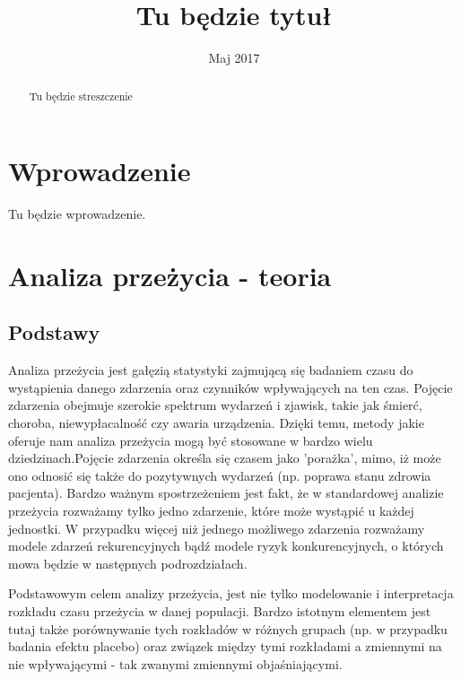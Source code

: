 \documentclass[]{pracamgr}
\title{Tu będzie tytuł}
\date{Maj 2017}
\begin{document}
\maketitle

\begin{abstract}
Tu będzie streszczenie
\end{abstract}

\tableofcontents

\chapter*{Wprowadzenie}

Tu będzie wprowadzenie.

\chapter{Analiza przeżycia - teoria}

\section{Podstawy}


Analiza przeżycia jest gałęzią statystyki zajmującą się badaniem czasu do wystąpienia danego zdarzenia oraz czynników wpływających na ten czas. Pojęcie zdarzenia obejmuje szerokie spektrum wydarzeń i zjawisk, takie jak śmierć, choroba, niewypłacalność czy awaria urządzenia. Dzięki temu, metody jakie oferuje nam analiza przeżycia mogą być stosowane w bardzo wielu dziedzinach.Pojęcie zdarzenia określa się czasem jako 'porażka', mimo, iż może ono odnosić się także do pozytywnych wydarzeń (np. poprawa stanu zdrowia pacjenta). Bardzo ważnym spostrzeżeniem jest fakt, że w standardowej analizie przeżycia rozważamy tylko jedno zdarzenie, które może wystąpić u każdej jednostki. W przypadku więcej niż jednego możliwego zdarzenia rozważamy modele zdarzeń rekurencyjnych bądź modele ryzyk konkurencyjnych, o których mowa będzie w następnych podrozdziałach.

Podstawowym celem analizy przeżycia, jest nie tylko modelowanie i interpretacja rozkładu czasu przeżycia w danej populacji. Bardzo istotnym elementem jest tutaj także porównywanie tych rozkładów w różnych grupach (np. w przypadku badania efektu placebo) oraz związek między tymi rozkładami a zmiennymi na nie wpływającymi - tak zwanymi zmiennymi objaśniającymi. 
\end{document}
